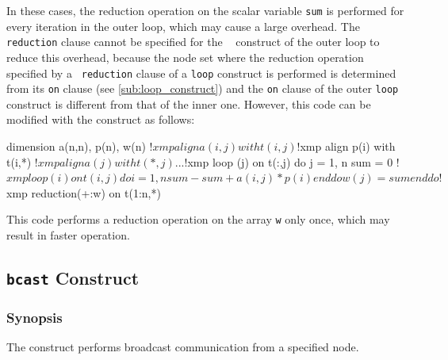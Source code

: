 \begin{description}

In these cases, the reduction operation on the scalar variable {\tt sum}
is performed for every iteration in the outer loop, which may cause a
large overhead.
The {\tt reduction} clause cannot be specified for the {\tt
{}} construct of the outer loop to reduce this overhead,
%
because the node set where the reduction operation specified by a {\tt
reduction} clause of a {\tt loop} construct is performed is determined
from its {\tt on} clause (see \ref{sub:loop_construct}) and
the {\tt on} clause of the outer {\tt loop} construct is different from
that of the inner one. 
%
However, this code can be modified with the {\tt {}}
construct as follows: 

\begin{XFexample}
      dimension a(n,n), p(n), w(n)
!$xmp align a(i,j) with t(i,j)
!$xmp align p(i) with t(i,*)
!$xmp align a(j) with t(*,j)
      ...
!$xmp loop (j) on t(:,j)
      do j = 1, n
          sum = 0
!$xmp loop (i) on t(i,j) 
          do i = 1, n
              sum - sum + a(i,j) * p(i)
          end do
          w(j) = sum
      end do
!$xmp reduction(+:w) on t(1:n,*)
\end{XFexample}

This code performs a reduction operation on the array {\tt w} only once,
which may result in faster operation.  

\end{description}


\subsection{{\tt bcast} Construct}

\subsubsection*{Synopsis}

The {\tt {}} construct performs broadcast communication
from a specified node.


